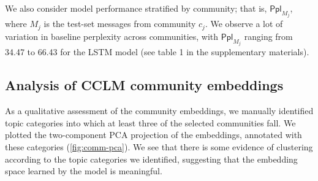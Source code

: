 \documentclass[11pt]{article}
\newcommand\Ppl{\mathsf{Ppl}}
\begin{document}
\begin{table}
  \small
  \centering
  
  \caption{
    Performance of baseline (first row for each encoder architecture) and CCLM models. 
    Perplexity and information gain are shown for the entire test set 
    (\num{5000} messages for each community).}
  \label{tab:model-results}
\end{table}

We also consider model performance stratified by community; that is,
$\Ppl_{M_j}$, where $M_j$ is the test-set messages from community
$c_j$.  We observe a lot of variation in baseline perplexity
across communities, with $\Ppl_{M_j}$ ranging from \num{34.47} to
\num{66.43} for the LSTM model (see table 1 in the supplementary materials).

\subsection{Analysis of CCLM community embeddings}

As a qualitative assessment of the community embeddings, 
we manually identified topic categories into which at least three
of the selected communities fall.
We plotted the two-component PCA projection of the embeddings,
annotated with these categories (\cref{fig:comm-pca}).
We see that there is some evidence of clustering according to
the topic categories we identified,
suggesting that the embedding space learned by the model is meaningful.

\begin{figure*}[t]
\caption{Community embedding PCA of an LSTM (left, $c=1$) and transformer (right, $c=3$) model.}
\label{fig:comm-pca}
\end{figure*}
\end{document}
